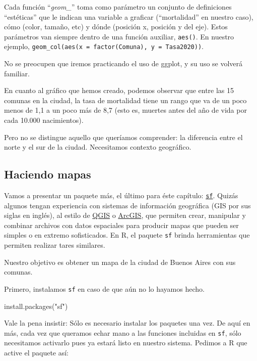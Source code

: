 \documentclass[
]{book}
\newenvironment{Shaded}{\begin{snugshade}}{\end{snugshade}}
\newcommand{\FunctionTok}[1]{\textcolor[rgb]{0.00,0.00,0.00}{#1}}
\newcommand{\NormalTok}[1]{#1}
\newcommand{\StringTok}[1]{\textcolor[rgb]{0.31,0.60,0.02}{#1}}
\begin{document}
Cada función ``\emph{geom\_}'' toma como parámetro un conjunto de definiciones ``estéticas'' que le indican una variable a graficar (``mortalidad'' en nuestro caso), cómo (color, tamaño, etc) y dónde (posición x, posición y del eje). Estos parámetros van siempre dentro de una función auxiliar, \texttt{aes()}. En nuestro ejemplo, \texttt{geom\_col(aes(x\ =\ factor(Comuna),\ y\ =\ Tasa2020))}.

No se preocupen que iremos practicando el uso de ggplot, y su uso se volverá familiar.

En cuanto al gráfico que hemos creado, podemos observar que entre las 15 comunas en la ciudad, la tasa de mortalidad tiene un rango que va de un poco menos de 1,1 a un poco más de 8,7 (esto es, muertes antes del año de vida por cada 10.000 nacimientos).

Pero no se distingue aquello que queríamos comprender: la diferencia entre el norte y el sur de la ciudad. Necesitamos contexto geográfico.

\hypertarget{haciendo-mapas}{%
\subsection{Haciendo mapas}\label{haciendo-mapas}}

Vamos a presentar un paquete más, el último para éste capítulo: \href{https://r-spatial.github.io/sf/}{\texttt{sf}}. Quizás algunos tengan experiencia con sistemas de información geográfica (GIS por sus siglas en inglés), al estilo de \href{https://qgis.org/en/site/}{QGIS} o \href{https://www.arcgis.com/features/index.html}{ArcGIS}, que permiten crear, manipular y combinar archivos con datos espaciales para producir mapas que pueden ser simples o en extremo sofisticados. En R, el paquete \texttt{sf} brinda herramientas que permiten realizar tares similares.

Nuestro objetivo es obtener un mapa de la ciudad de Buenos Aires con sus comunas.

Primero, instalamos \texttt{sf} en caso de que aún no lo hayamos hecho.

\begin{Shaded}
\begin{Highlighting}[]
\FunctionTok{install.packages}\NormalTok{(}\StringTok{"sf"}\NormalTok{)}
\end{Highlighting}
\end{Shaded}

Vale la pena insistir: Sólo es necesario instalar los paquetes una vez. De aquí en más, cada vez que queramos echar mano a las funciones incluidas en \texttt{sf}, sólo necesitamos activarlo pues ya estará listo en nuestro sistema. Pedimos a R que active el paquete así:
\end{document}
